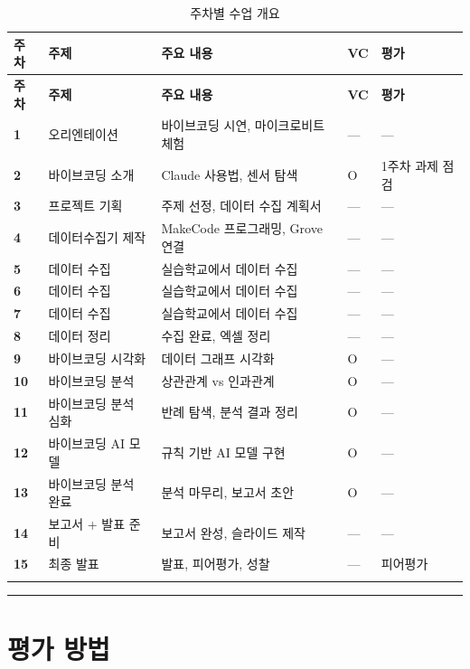 \documentclass[11pt, a4paper]{article}
\begin{document}
\begin{longtable}{|C{1cm}|L{3cm}|L{5cm}|C{1.5cm}|L{3cm}|}
\hline
{}
\textbf{주차} & \textbf{주제} & \textbf{주요 내용} & \textbf{VC} & \textbf{평가} \\
\hline
\endfirsthead
\hline
{}
\textbf{주차} & \textbf{주제} & \textbf{주요 내용} & \textbf{VC} & \textbf{평가} \\
\hline
\endhead
\textbf{1} & 오리엔테이션 & 바이브코딩 시연, 마이크로비트 체험 & — & — \\
\hline
\textbf{2} & 바이브코딩 소개 & Claude 사용법, 센서 탐색 & O & 1주차 과제 점검 \\
\hline
\textbf{3} & 프로젝트 기획 & 주제 선정, 데이터 수집 계획서 & — & — \\
\hline
\textbf{4} & 데이터수집기 제작 & MakeCode 프로그래밍, Grove 연결 & — & — \\
\hline
{}
\textbf{5} & 데이터 수집 & 실습학교에서 데이터 수집 & — & — \\
\hline
{}
\textbf{6} & 데이터 수집 & 실습학교에서 데이터 수집 & — & — \\
\hline
{}
\textbf{7} & 데이터 수집 & 실습학교에서 데이터 수집 & — & — \\
\hline
{}
\textbf{8} & 데이터 정리 & 수집 완료, 엑셀 정리 & — & — \\
\hline
\textbf{9} & 바이브코딩 시각화 & 데이터 그래프 시각화 & O & — \\
\hline
\textbf{10} & 바이브코딩 분석 & 상관관계 vs 인과관계 & O & — \\
\hline
\textbf{11} & 바이브코딩 분석 심화 & 반례 탐색, 분석 결과 정리 & O & — \\
\hline
\textbf{12} & 바이브코딩 AI 모델 & 규칙 기반 AI 모델 구현 & O & — \\
\hline
\textbf{13} & 바이브코딩 분석 완료 & 분석 마무리, 보고서 초안 & O & — \\
\hline
\textbf{14} & 보고서 + 발표 준비 & 보고서 완성, 슬라이드 제작 & — & — \\
\hline
\textbf{15} & 최종 발표 & 발표, 피어평가, 성찰 & — & 피어평가 \\
\hline
\caption{주차별 수업 개요}
\end{longtable}

\vspace{3pt}
\noindent\rule{\textwidth}{0.3pt}

\section{평가 방법}
\end{document}
